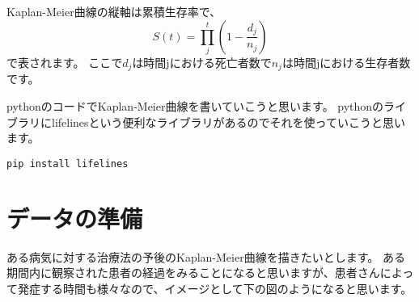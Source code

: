 \documentclass[11pt]{article}
\begin{document}
    Kaplan-Meier曲線の縦軸は累積生存率で、 \[
  S(t) = \prod_{j}^t (1-\frac{d_j}{n_j})
\] で表されます。
ここで\(d_j\)は時間jにおける死亡者数で\(n_j\)は時間jにおける生存者数です。

pythonのコードでKaplan-Meier曲線を書いていこうと思います。
pythonのライブラリにlifelinesという便利なライブラリがあるのでそれを使っていこうと思います。

\texttt{pip\ install\ lifelines}

    \hypertarget{ux30c7ux30fcux30bfux306eux6e96ux5099}{%
\section{データの準備}\label{ux30c7ux30fcux30bfux306eux6e96ux5099}}

    ある病気に対する治療法の予後のKaplan-Meier曲線を描きたいとします。
ある期間内に観察された患者の経過をみることになると思いますが、患者さんによって発症する時間も様々なので、イメージとして下の図のようになると思います。
\end{document}
